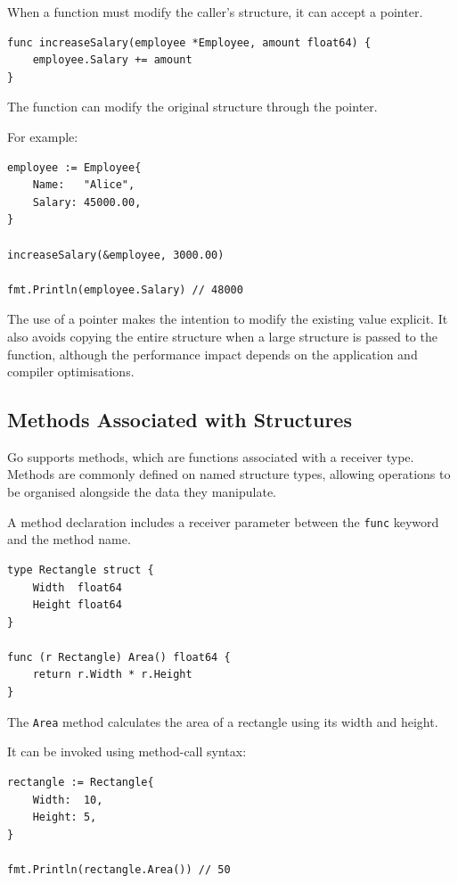 When a function must modify the caller's structure, it can accept a pointer.

\begin{lstlisting}
func increaseSalary(employee *Employee, amount float64) {
    employee.Salary += amount
}
\end{lstlisting}

The function can modify the original structure through the pointer.

For example:

\begin{lstlisting}
employee := Employee{
    Name:   "Alice",
    Salary: 45000.00,
}

increaseSalary(&employee, 3000.00)

fmt.Println(employee.Salary) // 48000
\end{lstlisting}

The use of a pointer makes the intention to modify the existing value explicit. It also avoids copying the entire structure when a large structure is passed to the function, although the performance impact depends on the application and compiler optimisations.

\subsection{Methods Associated with Structures}

Go supports methods, which are functions associated with a receiver type. Methods are commonly defined on named structure types, allowing operations to be organised alongside the data they manipulate.

A method declaration includes a receiver parameter between the \texttt{func} keyword and the method name.

\begin{lstlisting}
type Rectangle struct {
    Width  float64
    Height float64
}

func (r Rectangle) Area() float64 {
    return r.Width * r.Height
}
\end{lstlisting}

The \texttt{Area} method calculates the area of a rectangle using its width and height.

It can be invoked using method-call syntax:

\begin{lstlisting}
rectangle := Rectangle{
    Width:  10,
    Height: 5,
}

fmt.Println(rectangle.Area()) // 50
\end{lstlisting}

